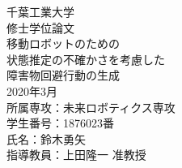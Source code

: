 \documentclass[a4paper,11pt]{ujreport}
\begin{document}
\begin{titlepage}
  \begin{center}
      {\large
      千葉工業大学\\
      修士学位論文
      }\\ %
      \vspace{100truept}
      {\huge
      移動ロボットのための\\
      \huge
      状態推定の不確かさを考慮した\\
      \huge
      障害物回避行動の生成
      }\\ %
      \vspace{10truept}
      \vspace{150truept}
      {\large
      2020年3月
      }\\ %
      \vspace{50truept}
      {\large
      所属専攻：未来ロボティクス専攻
      }\\ %
      {\large
      学生番号：1876023番\\
      氏名：鈴木勇矢 
      }\\ %
      \vspace{50truept}
      {\large
      指導教員：上田隆一 准教授
      }\\ %
  \end{center}
\end{titlepage}




\tableofcontents

\cleardoublepage
{}








% 
% 
% 
% 
% 
% 

% 



\newpage
\end{document}
